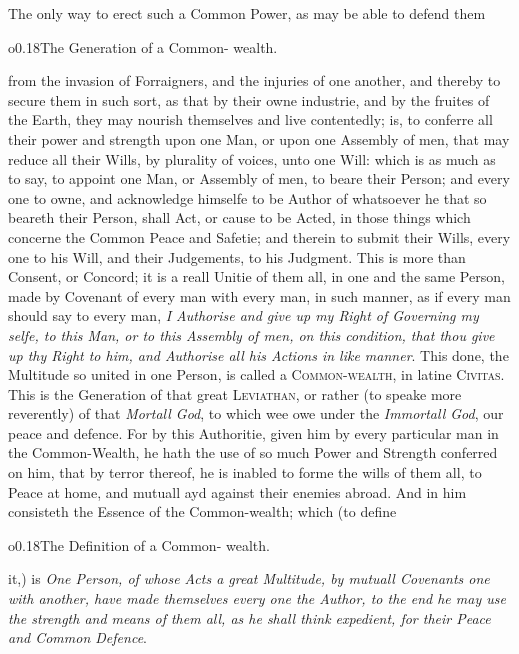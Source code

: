 The only way to erect such a Common Power, as may be able to defend
them \begin{wrapfigure}[4]{o}{0.18\textwidth}\wrapadj The Generation of
a Common- wealth. \end{wrapfigure} from the invasion of Forraigners,
and the injuries of one another, and thereby to secure them in such
sort, as that by their owne industrie, and by the fruites of the
Earth, they may nourish themselves and live contentedly; is, to
conferre all their power and strength upon one Man, or upon one
Assembly of men, that may reduce all their Wills, by plurality of
voices, unto one Will: which is as much as to say, to appoint one Man,
or Assembly of men, to beare their Person; and every one to owne, and
acknowledge himselfe to be Author of whatsoever he that so beareth
their Person, shall Act, or cause to be Acted, in those things which
concerne the Common Peace and Safetie; and therein to submit their
Wills, every one to his Will, and their Judgements, to his Judgment.
This is more than Consent, or Concord; it is a reall Unitie of them
all, in one and the same Person, made by Covenant of every man with
every man, in such manner, as if every man should say to every man,
\textit{I Authorise and give up my Right of Governing my selfe, to
this Man, or to this Assembly of men, on  this condition,
that thou give up thy Right to him, and Authorise all his Actions in
like manner}. This done, the Multitude so united in one Person, is
called a \textsc{Common-wealth}, in latine \textsc{Civitas}. This is
the Generation of that great \textsc{Leviathan}, or rather (to speake
more reverently) of that \textit{Mortall God}, to which wee owe under
the \textit{Immortall God}, our peace and defence. For by this
Authoritie, given him by every particular man in the Common-Wealth, he
hath the use of so much Power and Strength conferred on him, that by
terror thereof, he is inabled to forme the wills of them all, to Peace
at home, and mutuall ayd against their enemies abroad. And in him
consisteth the Essence of the Common-wealth; which (to define


\noindent\begin{wrapfigure}[4]{o}{0.18\textwidth}\wrapadj The
Definition of a Common- wealth. \end{wrapfigure} it,) is \textit{One
Person, of whose Acts a great Multitude, by mutuall Covenants one with
another, have made themselves every one the Author, to the end he may
use the strength and means of them all, as he shall think expedient,
for their Peace and Common Defence}.

